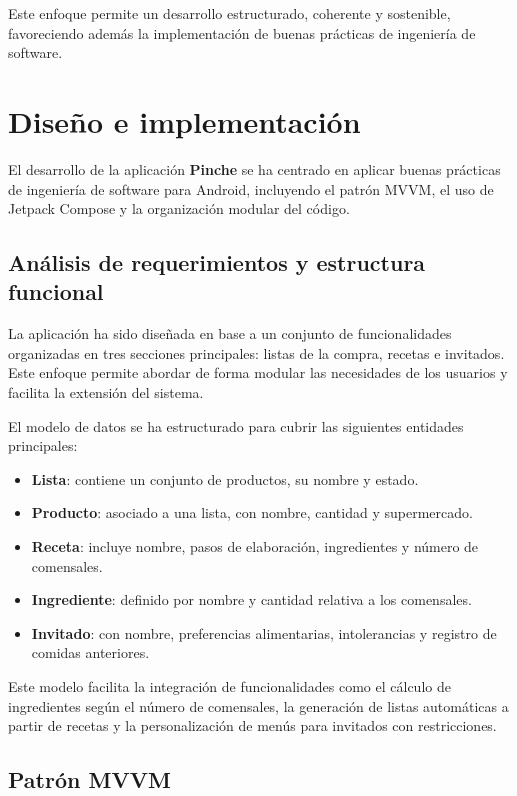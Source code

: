 Este enfoque permite un desarrollo estructurado, coherente y sostenible, favoreciendo además la implementación de buenas prácticas de ingeniería de software.


\section{Diseño e implementación}
\label{sec:diseno-implementacion}

El desarrollo de la aplicación \textbf{Pinche} se ha centrado en aplicar buenas prácticas de ingeniería de software para Android, incluyendo el patrón MVVM, el uso de Jetpack Compose y la organización modular del código.

\subsection{Análisis de requerimientos y estructura funcional}

La aplicación ha sido diseñada en base a un conjunto de funcionalidades organizadas en tres secciones principales: listas de la compra, recetas e invitados. Este enfoque permite abordar de forma modular las necesidades de los usuarios y facilita la extensión del sistema.

El modelo de datos se ha estructurado para cubrir las siguientes entidades principales:

\begin{itemize}
    \item \textbf{Lista}: contiene un conjunto de productos, su nombre y estado.
    \item \textbf{Producto}: asociado a una lista, con nombre, cantidad y supermercado.
    \item \textbf{Receta}: incluye nombre, pasos de elaboraci\'on, ingredientes y número de comensales.
    \item \textbf{Ingrediente}: definido por nombre y cantidad relativa a los comensales.
    \item \textbf{Invitado}: con nombre, preferencias alimentarias, intolerancias y registro de comidas anteriores.
\end{itemize}

Este modelo facilita la integración de funcionalidades como el cálculo de ingredientes según el número de comensales, la generación de listas automáticas a partir de recetas y la personalización de menús para invitados con restricciones.

\subsection{Patr\'on MVVM}

